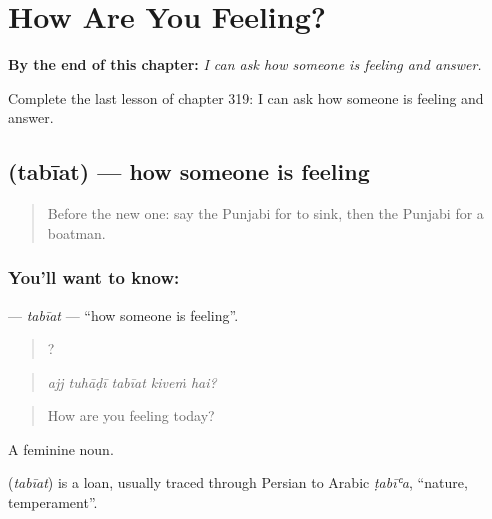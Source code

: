 
\chapter{How Are You Feeling?}
\label{ch:pa-a2-how-are-you-feeling}

\begin{chapteropening}
\textbf{By the end of this chapter:} \emph{I can ask how someone is feeling and answer.}

Complete the last lesson of chapter 319: I can ask how someone is feeling and answer.
\end{chapteropening}

\section[\texorpdfstring{\pa{ਤਬੀਅਤ} (tabīat)}{ਤਬੀਅਤ (tabīat)}]{ (tabīat) — how someone is feeling}

\label{lesson:PA-C319-tabiat}



\begin{quote}
Before the new one: say the Punjabi for to sink, then the Punjabi for a boatman.
\end{quote}

\subsection*{You'll want to know: }
\textbf{} — \emph{tabīat} — \textquotedblleft{}how someone is feeling\textquotedblright{}.

\begin{quote}
    ?
\end{quote}

\begin{quote}
\emph{ajj tuhāḍī tabīat kiveṁ hai?}
\end{quote}

\begin{quote}
How are you feeling today?
\end{quote}

A feminine noun.

\begin{cousinweb}
\textbf{} (\emph{tabīat}) is a loan, usually traced through Persian to Arabic \emph{ṭabīʿa}, \textquotedblleft{}nature, temperament\textquotedblright{}.
\end{cousinweb}


